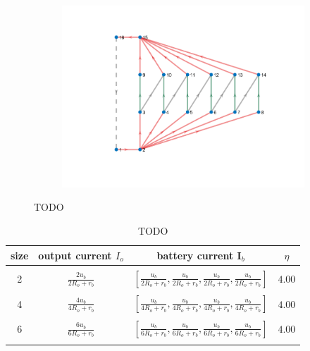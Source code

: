 \documentclass{article}
\begin{document}
\begin{figure}[htbp]
\begin{subfigure}[b]{0.45\textwidth}
    \includegraphics[width=\textwidth]{../attachments/f-dege-mac-6.png}
    \caption{}
    \label{fig:f6-mac}
  \end{subfigure}
    
  \caption{TODO}
  \label{fig:d-sizes}
\end{figure}

\begin{table}[h]
    \caption{TODO}
    \label{tab:d-structure}
    \begin{tabular}{cccc}
        \hline
        size &  output current $I_o$       & battery current $\bm{I}_b$       & $\eta$        \\ 
        \hline\\
        2 &  $\displaystyle\frac{2u_b}{2R_o + r_b}$ &  $\displaystyle\left[\frac{u_b}{2R_o + r_b},\frac{u_b}{2R_o + r_b},\frac{u_b}{2R_o + r_b},\frac{u_b}{2R_o + r_b}\right]$   & $4.00$ \\ 
        \\
        4 &  $\displaystyle\frac{4u_b}{4R_o + r_b}$ &  $\displaystyle\left[\frac{u_b}{4R_o + r_b},\frac{u_b}{4R_o + r_b},\frac{u_b}{4R_o + r_b},\frac{u_b}{4R_o + r_b}\right]$   & $4.00$ \\ 
        \\
        6 &  $\displaystyle\frac{6u_b}{6R_o + r_b}$ &  $\displaystyle\left[\frac{u_b}{6R_o + r_b},\frac{u_b}{6R_o + r_b},\frac{u_b}{6R_o + r_b},\frac{u_b}{6R_o + r_b}\right]$   & $4.00$ \\ 
        \\
        \hline
    \end{tabular}
\end{table}
\end{document}
